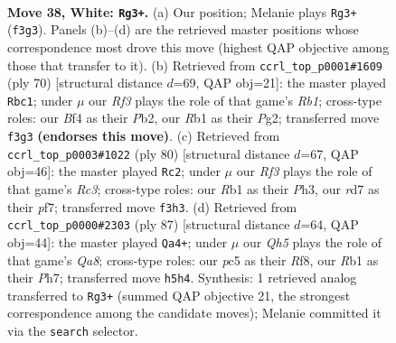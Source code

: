 \documentclass[11pt]{article}
\begin{document}
\clearpage

\begin{figure}[p]\centering
\begin{subfigure}{0.46\textwidth}\centering
\resizebox{\linewidth}{!}{%
\newchessgame
\chessboard[
  setfen={5rk1/3r3n/8/pqp4Q/5B2/1P3R2/P7/1R4K1 w - - 1 38},
  showmover=false,
  pgfstyle=straightmove, color=movearrow, markmove={f3-g3}
]}
\caption{}
\end{subfigure}\hfill
\begin{subfigure}{0.46\textwidth}\centering
\resizebox{\linewidth}{!}{%
\newchessgame
\chessboard[
  setfen={1r6/1rq4k/4Q1pp/8/p7/P1p5/1P4PP/1R3R1K w - - 0 36},
  showmover=false,
  pgfstyle=straightmove, color=movearrow, markmove={b1-c1}
]}
\caption{}
\end{subfigure}
\\[4pt]
\begin{subfigure}{0.46\textwidth}\centering
\resizebox{\linewidth}{!}{%
\newchessgame
\chessboard[
  setfen={2r2k2/3nqp2/8/6p1/2B5/2R1P2P/5P2/3Q2K1 w - - 1 41},
  showmover=false,
  pgfstyle=straightmove, color=movearrow, markmove={c3-c2}
]}
\caption{}
\end{subfigure}\hfill
\begin{subfigure}{0.46\textwidth}\centering
\resizebox{\linewidth}{!}{%
\newchessgame
\chessboard[
  setfen={5r1k/7p/3prb2/8/8/2P2R2/3Q1RPP/q1NK4 b - - 0 44},
  showmover=false,
  pgfstyle=straightmove, color=movearrow, markmove={a1-a4}
]}
\caption{}
\end{subfigure}
\caption{\textbf{Move 38, White: \texttt{Rg3+}.} (a) Our position; Melanie plays \texttt{Rg3+} (\texttt{f3g3}). Panels (b)--(d) are the retrieved master positions whose correspondence most drove this move (highest QAP objective among those that transfer to it). (b) Retrieved from \texttt{ccrl\_top\_p0001\#1609} (ply 70) [structural distance $d$=69, QAP obj=21]: the master played \texttt{Rbc1}; under $\mu$ our \emph{Rf3} plays the role of that game's \emph{Rb1}; cross-type roles: our \emph{B}f4 as their \emph{P}b2, our \emph{R}b1 as their \emph{P}g2; transferred move \texttt{f3g3} \textbf{(endorses this move)}. (c) Retrieved from \texttt{ccrl\_top\_p0003\#1022} (ply 80) [structural distance $d$=67, QAP obj=46]: the master played \texttt{Rc2}; under $\mu$ our \emph{Rf3} plays the role of that game's \emph{Rc3}; cross-type roles: our \emph{R}b1 as their \emph{P}h3, our \emph{r}d7 as their \emph{p}f7; transferred move \texttt{f3h3}. (d) Retrieved from \texttt{ccrl\_top\_p0000\#2303} (ply 87) [structural distance $d$=64, QAP obj=44]: the master played \texttt{Qa4+}; under $\mu$ our \emph{Qh5} plays the role of that game's \emph{Qa8}; cross-type roles: our \emph{p}c5 as their \emph{R}f8, our \emph{R}b1 as their \emph{P}h7; transferred move \texttt{h5h4}. Synthesis: 1 retrieved analog transferred to \texttt{Rg3+} (summed QAP objective 21, the strongest correspondence among the candidate moves); Melanie committed it via the \texttt{search} selector.}
\label{fig:thought-m74}
\end{figure}
\end{document}
